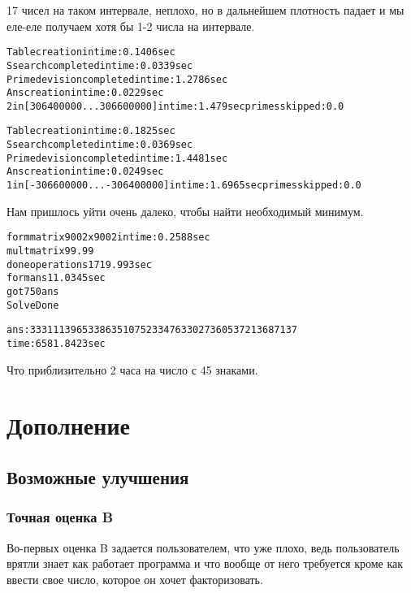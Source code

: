 17 чисел на таком интервале, неплохо, но в дальнейшем плотность падает и мы еле-еле получаем хотя бы 1-2 числа на интервале.

\begin{alltt}
Table creation in time: 0.1406 sec
S search completed in time: 0.0339 sec
Prime devision completed in time: 1.2786 sec
Ans creation in time: 0.0229 sec
2 in [306400000...306600000] in time: 1.479 sec primes skipped: 0.0 %

Table creation in time: 0.1825 sec
S search completed in time: 0.0369 sec
Prime devision completed in time: 1.4481 sec
Ans creation in time: 0.0249 sec
1 in [-306600000...-306400000] in time: 1.6965 sec primes skipped: 0.0 %
\end{alltt}

Нам пришлось уйти очень далеко, чтобы найти необходимый минимум.

\begin{alltt}
form matrix 9002 x 9002 in time: 0.2588 sec
mult matrix 99.99 %
done operations 1719.993 sec
form ans 11.0345 sec
got 750 ans
Solve Done

ans: 3331113965338635107 523347633027360537213687137
time: 6581.8423 sec
\end{alltt}

Что приблизительно 2 часа на число с 45 знаками.










\section{Дополнение}

\subsection{Возможные улучшения}

\subsubsection{Точная оценка B}

Во-первых оценка B задается пользователем, что уже плохо, ведь пользователь врятли знает как работает программа и что вообще от него требуется кроме как ввести свое число, которое он хочет факторизовать.

